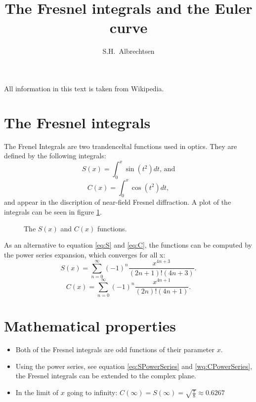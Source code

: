 \documentclass[twocolumn]{article}
\title{\vspace{-3.5cm}The Fresnel integrals and the Euler curve}
\author{S.H.~Albrechtsen}
\begin{document}
\maketitle
All information in this text is taken from Wikipedia\cite{WikiFresnelIntegral}.
\section{The Fresnel integrals}
The Frenel Integrals are two trandenceltal functions used in optics. They are defined by the following integrals:
\begin{equation}
S(x) = \int_{0}^{x} \sin(t^2) dt\label{eq:S} \textrm{, and}
\end{equation}
\begin{equation}
C(x) = \int_{0}^{x} \cos(t^2) dt\label{eq:C},
\end{equation}
and appear in the discription of near-field Fresnel diffraction. A plot of the integrals can be seen in figure \ref{fig:SandC}.

\begin{figure}
\centering

\caption{The $S(x)$ and $C(x)$ functions.\label{fig:SandC}}
\end{figure}

As an alternative to equation \ref{eq:S} and \ref{eq:C}, the functions can be computed by the power series expansion, which converges for all x:
\begin{equation}\label{eq:SPowerSeries}
S(x) = \sum_{n=0}^{\infty}(-1)^n\frac{x^{4n+3}}{(2n+1)!(4n+3)}.
\end{equation}
\begin{equation}\label{eq:CPowerSeries}
C(x) = \sum_{n=0}^{\infty}(-1)^n\frac{x^{4n+1}}{(2n)!(4n+1)}.
\end{equation}

\section{Mathematical properties}
\begin{itemize}
\item Both of the Fresnel integrals are odd functions of their parameter $x$.
\item Using the power series, see equation \ref{eq:SPowerSeries} and \ref{wq:CPowerSeries}, the Fresnel integrals can be extended to the complex plane.
\item In the limit of $x$ going to infinity: $C(\infty) = S(\infty) = \sqrt{\frac{\pi}{8}}\approx0.6267$
\end{itemize}
\end{document}
